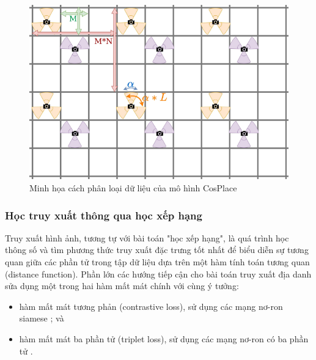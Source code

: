\begin{figure}[H]
    \centering
    \includegraphics[width=\textwidth]{pics/Chapter2/cosplaceclassify.png}
    \caption{Minh họa cách phân loại dữ liệu của mô hình CosPlace \cite{berton2022rethinking}}
\end{figure}

\subsubsection{Học truy xuất thông qua học xếp hạng}

Truy xuất hình ảnh, tương tự với bài toán "học xếp hạng", là quá trình học thông số và tìm phương thức truy xuất đặc trưng tốt nhất để biểu diễn sự tương quan giữa các phần tử trong tập dữ liệu dựa trên một hàm tính toán tương quan (distance function). Phần lớn các hướng tiếp cận cho bài toán truy xuất địa danh sửa dụng một trong hai hàm mất mát chính với cùng ý tưởng:

\begin{itemize}
    \item hàm mất mát tương phản (contrastive loss), sử dụng các mạng nơ-ron siamese \cite{ong2017siamese, GeM, randenovic2016BoW}; và
    \item hàm mất mát ba phần tử (triplet loss), sử dụng các mạng nơ-ron có ba phần tử \cite{arandjelovic2016netvlad, gordo2016deep, gordo2017endtoend, wang2014learning, jin2017learned, zheng2018sift}.
\end{itemize}

